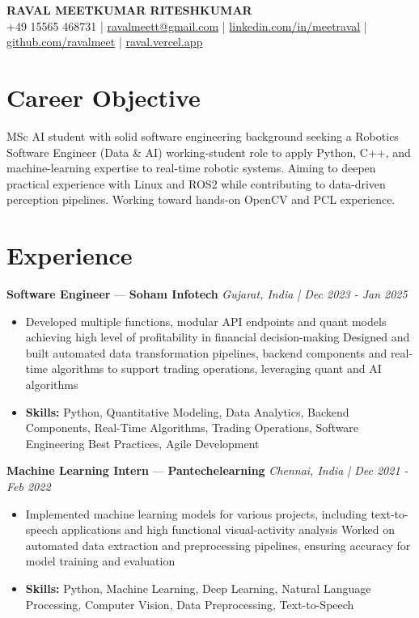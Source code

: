 \documentclass[a4paper,10pt]{article}
\begin{document}
\begin{center}
  {\Large\bfseries RAVAL MEETKUMAR RITESHKUMAR}\\[2pt]
  {\small +49 15565 468731 \;|\; \href{mailto:ravalmeett@gmail.com}{ravalmeett@gmail.com} \;|\; \href{https://www.linkedin.com/in/meetraval/}{linkedin.com/in/meetraval} \;|\; \href{https://github.com/ravalmeet}{github.com/ravalmeet} \;|\; \href{https://raval.vercel.app/}{raval.vercel.app}}
\end{center}
\vspace{-3pt}

\section*{Career Objective}
MSc AI student with solid software engineering background seeking a Robotics Software Engineer (Data \& AI) working-student role to apply Python, C++, and machine-learning expertise to real-time robotic systems. Aiming to deepen practical experience with Linux and ROS2 while contributing to data-driven perception pipelines. Working toward hands-on OpenCV and PCL experience.\par

\section*{Experience}
\textbf{Software Engineer} — \textbf{Soham Infotech} \hfill \textit{Gujarat, India \;|\; Dec 2023 - Jan 2025}\par
\vspace{1pt}
\begin{itemize}
  \item Developed multiple functions, modular API endpoints and quant models achieving high level of profitability in financial decision-making Designed and built automated data transformation pipelines, backend components and real-time algorithms to support trading operations, leveraging quant and AI algorithms
  \item \textbf{Skills:} Python, Quantitative Modeling, Data Analytics, Backend Components, Real-Time Algorithms, Trading Operations, Software Engineering Best Practices, Agile Development
\end{itemize}
\vspace{3pt}
\textbf{Machine Learning Intern} — \textbf{Pantechelearning} \hfill \textit{Chennai, India \;|\; Dec 2021 - Feb 2022}\par
\vspace{1pt}
\begin{itemize}
  \item Implemented machine learning models for various projects, including text-to-speech applications and high functional visual-activity analysis Worked on automated data extraction and preprocessing pipelines, ensuring accuracy for model training and evaluation
  \item \textbf{Skills:} Python, Machine Learning, Deep Learning, Natural Language Processing, Computer Vision, Data Preprocessing, Text-to-Speech
\end{itemize}
\end{document}
